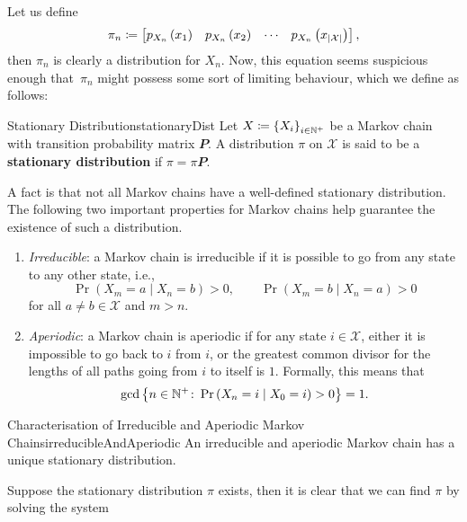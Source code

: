 \documentclass[math]{amznotes}
\theoremstyle{remark}
\begin{document}
Let us define 
\begin{equation*}
    \pi_n \coloneqq \begin{bmatrix}
        p_{X_{n}}\left(x_1\right) & p_{X_{n}}\left(x_2\right) & \cdots & p_{X_{n}}\left(x_{{\left\lvert {\mathcal{X}} \right\rvert}}\right)
    \end{bmatrix},
\end{equation*}
then $\pi_n$ is clearly a distribution for $X_n$. Now, this equation seems suspicious enough that~$\pi_n$ might possess some sort of limiting behaviour, which we define as follows:
\begin{dfnbox}{Stationary Distribution}{stationaryDist}
    Let $X \coloneqq \left\{X_i\right\}_{i \in \mathbb{N}^+}$ be a Markov chain with transition probability matrix $\mathbfit{P}$. A distribution $\pi$ on $\mathcal{X}$ is said to be a {\color{red} \textbf{stationary distribution}} if $\pi = \pi\mathbfit{P}$.
\end{dfnbox}
A fact is that not all Markov chains have a well-defined stationary distribution. The following two important properties for Markov chains help guarantee the existence of such a distribution.
\begin{enumerate}
    \item \textit{Irreducible}: a Markov chain is irreducible if it is possible to go from any state to any other state, i.e.,
    \begin{equation*}
        \Pr\left(X_m = a \mid X_n = b\right) > 0, \qquad \Pr\left(X_m = b \mid X_n = a\right) > 0
    \end{equation*}
    for all $a \neq b \in \mathcal{X}$ and $m > n$.
    \item \textit{Aperiodic}: a Markov chain is aperiodic if for any state $i \in \mathcal{X}$, either it is impossible to go back to $i$ from $i$, or the greatest common divisor for the lengths of all paths going from $i$ to itself is $1$. Formally, this means that 
    \begin{equation*}
        \gcd\left\{n \in \mathbb{N}^+ \colon \Pr\left(X_n = i \mid X_0 = i\right) > 0\right\} = 1.
    \end{equation*}
\end{enumerate}
\begin{thmbox}{Characterisation of Irreducible and Aperiodic Markov Chains}{irreducibleAndAperiodic}
    An irreducible and aperiodic Markov chain has a unique stationary distribution.
\end{thmbox}
Suppose the stationary distribution $\pi$ exists, then it is clear that we can find $\pi$ by solving the system 
\end{document}
